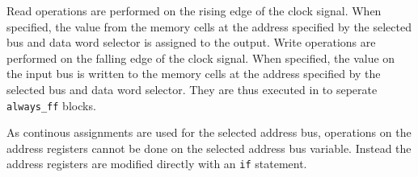 Read operations are performed on the rising edge of the clock signal. When specified, the value from the memory cells at the address specified by the selected bus and data word selector is assigned to the output. Write operations are performed on the falling edge of the clock signal. When specified, the value on the input bus is written to the memory cells at the address specified by the selected bus and data word selector. They are thus executed in to seperate \texttt{always\_ff} blocks.

As continous assignments are used for the selected address bus, operations on the address registers cannot be done on the selected address bus variable. Instead the address registers are modified directly with an \texttt{if} statement.



